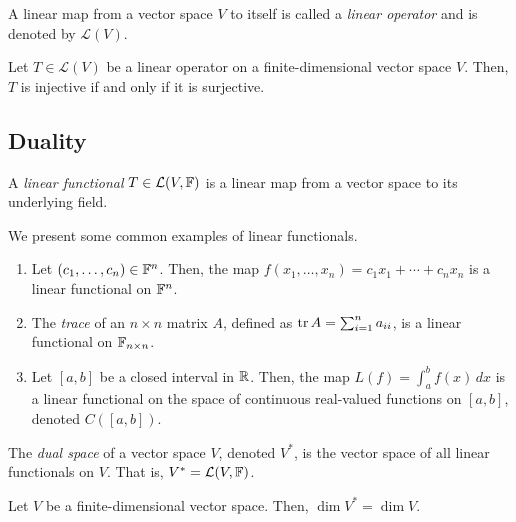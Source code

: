 \documentclass{article}
\begin{document}
\begin{definition}
  A linear map from a vector space $V$ to itself is called a \emph{linear operator} and is denoted by $\mathcal{L}(V)$.
\end{definition}

\begin{theorem}
  Let $T \in \mathcal{L}(V)$ be a linear operator on a finite-dimensional vector space $V$.
  Then, $T$ is injective if and only if it is surjective.
\end{theorem}

\subsection{Duality}

\begin{definition}
  A \emph{linear functional} $T \in \mathcal{L}(V, \mathbb{F})$ is a linear map from a vector space to its underlying field.
\end{definition}

\begin{example}
  We present some common examples of linear functionals.
  \begin{enumerate}
    \item Let $(c_1, \ldots, c_n) \in \mathbb{F}^n$.
          Then, the map $f(x_1, \ldots, x_n) = c_1x_1 + \cdots + c_nx_n$ is a linear functional on $\mathbb{F}^n$.
    \item The \emph{trace} of an $n \times n$ matrix $A$, defined as $\tr A = \sum_{i = 1}^n a_{ii}$, is a linear functional on $\mathbb{F}_{n \times n}$.
    \item Let $[a, b]$ be a closed interval in $\mathbb{R}$.
          Then, the map $L(f) = \int_a^b f(x) \,dx$ is a linear functional on the space of continuous real-valued functions on $[a, b]$, denoted $C([a, b])$.
  \end{enumerate}
\end{example}

\begin{definition}
  The \emph{dual space} of a vector space $V$, denoted $V^*$, is the vector space of all linear functionals on $V$.
  That is, $V^* = \mathcal{L}(V, \mathbb{F})$.
\end{definition}

\begin{theorem}[$\dim V^* = \dim V$]
  Let $V$ be a finite-dimensional vector space.
  Then, $\dim V^* = \dim V$.
\end{theorem}
\end{document}
